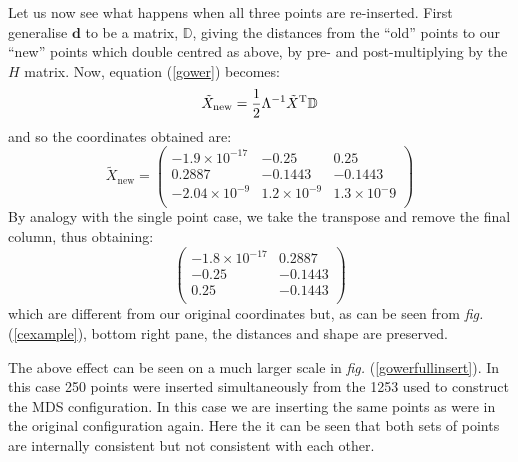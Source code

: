 \documentclass[a4paper,10pt]{article}
\newcommand{\fig}[1]{\emph{fig.} (\ref{#1})}
\newcommand{\tr}[1]{#1^{\text{T}}}
\newcommand{\cross}{\times}
\begin{document}
Let us now see what happens when all three points are re-inserted. First generalise $\mathbf{d}$ to be a matrix, $\mathbb{D}$, giving the distances from the ``old'' points to our ``new'' points which double centred as above, by pre- and post-multiplying by the $H$ matrix. Now, equation (\ref{gower}) becomes:
\begin{equation*}
\tilde{X}_{\text{new}} = \frac{1}{2} \Lambda^{-1} \tr{\tilde{X}} \mathbb{D}\\
\end{equation*}
and so the coordinates obtained are:
\begin{equation*}
\tilde{X}_\text{new}=\begin{pmatrix}
-1.9\cross 10^{-17} & -0.25 & 0.25\\
 0.2887 & -0.1443 & -0.1443\\
-2.04\cross 10^{-9} &  1.2\cross 10^{-9} & 1.3\cross 10^-{9}\\
\end{pmatrix}
\end{equation*}
By analogy with the single point case, we take the transpose and remove the final column, thus obtaining:
\begin{equation*}
\begin{pmatrix}
-1.8\cross 10^{-17} &  0.2887\\
-0.25 & -0.1443\\
 0.25 & -0.1443\\
\end{pmatrix}
\end{equation*}
which are different from our original coordinates but, as can be seen from \fig{cexample}, bottom right pane, the distances and shape are preserved.

The above effect can be seen on a much larger scale in \fig{gowerfullinsert}. In this case 250 points were inserted simultaneously from the 1253 used to construct the MDS configuration. In this case we are inserting the same points as were in the original configuration again. Here the it can be seen that both sets of points are internally consistent but not consistent with each other. 
\end{document}

